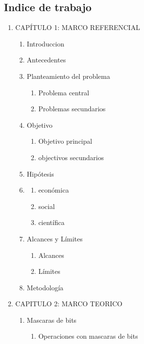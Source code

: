 \documentclass[11pt]{extarticle}
\begin{document}
\subsection{Indice de trabajo}
  \begin{enumerate}
    \item CAPÍTULO 1: MARCO REFERENCIAL
    \begin{enumerate}
      \item Introduccion
      \item Antecedentes
      \item Planteamiento del problema
        \begin{enumerate}
          \item Problema central
          \item Problemas secundarios
        \end{enumerate}
      \item Objetivo
        \begin{enumerate}
          \item Objetivo principal
          \item objectivos secundarios
        \end{enumerate}
      \item Hip\'otesis
      \item \justificacion
        \begin{enumerate}
          \item \justificacion econ\'omica
          \item \justificacion social
          \item \justificacion cient\'ifica
        \end{enumerate}
      \item Alcances y L\'imites
        \begin{enumerate}
          \item Alcances
          \item L\'imites
        \end{enumerate}
      \item Metodolog\'ia
    \end{enumerate}
    \item CAPITULO 2: MARCO TEORICO
      \begin{enumerate}
        \item Mascaras de bits
        \begin{enumerate}
          \item Operaciones con mascaras de bits
        \end{enumerate}

\end{enumerate}
\end{enumerate}
\end{document}

